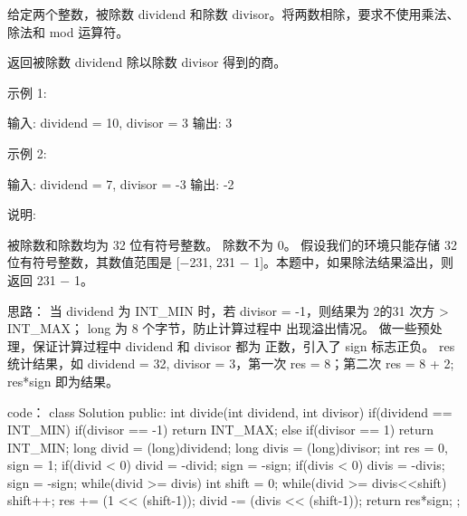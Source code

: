 给定两个整数，被除数 dividend 和除数 divisor。将两数相除，要求不使用乘法、除法和 mod 运算符。

返回被除数 dividend 除以除数 divisor 得到的商。

示例 1:

输入: dividend = 10, divisor = 3
输出: 3

示例 2:

输入: dividend = 7, divisor = -3
输出: -2

说明:

    被除数和除数均为 32 位有符号整数。
    除数不为 0。
    假设我们的环境只能存储 32 位有符号整数，其数值范围是 [−231,  231 − 1]。本题中，如果除法结果溢出，则返回 231 − 1。



























思路：
当 dividend 为 INT_MIN 时，若 divisor = -1，则结果为 2的31 次方 > INT_MAX；
long 为 8 个字节，防止计算过程中 出现溢出情况。
做一些预处理，保证计算过程中 dividend 和 divisor 都为 正数，引入了 sign 标志正负。
res 统计结果，如 dividend = 32, divisor = 3，第一次 res = 8；第二次 res = 8 + 2; res*sign 即为结果。 























code：
class Solution {
public:
    int divide(int dividend, int divisor) {
        if(dividend == INT_MIN)
        {
            if(divisor == -1) return INT_MAX;
            else if(divisor == 1) return INT_MIN;
        }
        long divid = (long)dividend;
        long divis = (long)divisor;
        int res = 0, sign = 1;
        if(divid < 0)
        {
            divid = -divid; sign = -sign;
        }
        if(divis < 0)
        {
            divis = -divis; sign = -sign;
        }
        while(divid >= divis)
        {
            int shift = 0;
            while(divid >= divis<<shift)
                shift++;
            res += (1 << (shift-1));
            divid -= (divis << (shift-1));
        }
        return res*sign;
    }
};